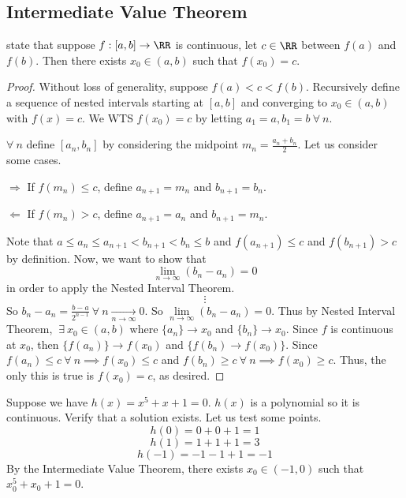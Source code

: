 \documentclass[12pt]{scrartcl}
\begin{document}
\subsection{Intermediate Value Theorem}

\begin{theorem}
   state that suppose $f: [a, b] \to \RR$ is continuous, 
  let $c \in \RR$ between $f(a)$ and $f(b)$.
  Then there exists $x_0 \in (a, b)$ such that $f(x_0) = c$. 

  \begin{proof}
    Without loss of generality, suppose $f(a) < c < f(b)$. Recursively define a sequence of 
    nested intervals starting at $[a, b]$ and converging to $x_0 \in (a, b)$ with $f(x) = c$.
    We WTS $f(x_0) = c$ by letting $a_1 = a, b_1 = b \ \forall \ n$. 

    
    $\forall \ n$ define $[a_n, b_n]$ by considering the midpoint $m_n = \frac{a_n + b_n}{2}$. 
    Let us consider some cases. 

    $\Longrightarrow$ If $f(m_n) \leq c$, define $a_{n+1} = m_n$ and $b_{n+1} = b_n$. 

    $\Longleftarrow$ If $f(m_n) > c$, define $a_{n+1} = a_n$ and $b_{n+1} = m_n$. 

    Note that $a \leq a_n \leq a_{n+1} < b_{n+1} < b_n \leq b$ and $f(a_{n+1}) \leq c$ and $f(b_{n+1}) > c$ 
    by definition. Now, we want to show that 
    \[\lim_{n\to\infty}(b_n - a_n) = 0\]
    in order to apply the Nested Interval Theorem.
    \[\vdots\]
    So $b_n - a_n = \frac{b - a}{2^{n-1}} \ \forall \ n \underset{n\to\infty}{\to}0$. So 
    $\underset{n\to\infty}{\lim}(b_n - a_n) = 0$. Thus by Nested Interval Theorem, 
    $\ \exists \ x_0 \in (a, b)$ where $\{a_n\} \to x_0$ and $\{b_n\} \to x_0$. Since 
    $f$ is continuous at $x_0$, then $\{f(a_n)\} \to f(x_0)$ and $\{f(b_n) \to f(x_0)\}$. 
    Since $f(a_n) \leq c \ \forall \ n \implies f(x_0) \leq c$ and $f(b_n) \geq c \ \forall \ n \implies f(x_0) \geq c$.
    Thus, the only this is true is $f(x_0) = c$, as desired.
  \end{proof}
\end{theorem}

\begin{example}
  Suppose we have $h(x) = x^5 + x + 1 = 0$. $h(x)$ is a polynomial so it is continuous. 
  Verify that a solution exists. Let us test some points.
  \[h(0) = 0 + 0 + 1 = 1\]
  \[h(1) = 1 + 1 + 1 = 3\]
  \[h(-1) = -1 - 1 + 1 = -1\]
  By the Intermediate Value Theorem, there exists $x_0 \in (-1, 0)$ such that $x_0^5 + x_0 + 1 = 0$.
\end{example}
\end{document}
